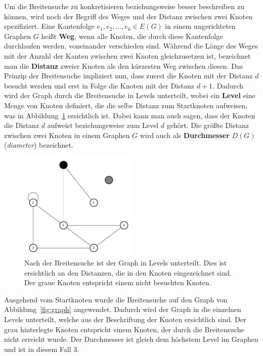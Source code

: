 \documentclass[11pt,a4paper]{article}
\begin{document}
Um die Breitensuche zu konkretisieren beziehungsweise besser beschreiben zu können, wird noch der Begriff des Weges und der Distanz zwischen zwei Knoten spezifiziert. Eine Kantenfolge \(e_{1}, e_{2}, ..., e_{k} \in E(G)\) in einem ungerichteten Graphen \(G\) heißt \textbf{Weg}, wenn alle Knoten, die durch diese Kantenfolge durchlaufen werden, voneinander verschieden sind. Während die Länge des Weges mit der Anzahl der Kanten zwischen zwei Knoten gleichzusetzen ist, bezeichnet man die \textbf{Distanz} zweier Knoten  als den kürzesten Weg zwischen diesen. Das Prinzip der Breitensuche impliziert nun, dass zuerst die Knoten mit der Distanz \(d\) besucht werden und erst in Folge die Knoten mit der Distanz \(d+1\). Dadurch wird der Graph durch die Breitensuche in Levels unterteilt, wobei ein \textbf{Level} eine Menge von Knoten definiert, die die selbe Distanz zum Startknoten aufweisen, was in Abbildung~\ref{fig:graph_level} ersichtlich ist. Dabei kann man auch sagen, dass der Knoten die Distanz \(d\) aufweist beziehungsweise zum Level \(d\) gehört. Die größte Distanz zwischen zwei Knoten in einem Graphen \(G\) wird auch als \textbf{Durchmesser} \(D(G)\) (\textit{diameter}) bezeichnet.\\
\begin{figure}[h]
 	\centering
	\includegraphics[width=0.5\textwidth]{graph_level}
 	\caption{Nach der Breitensuche ist der Graph in Levels unterteilt. Dies ist ersichtlich an den Distanzen, die in den Knoten eingezeichnet sind. Der graue Knoten entspricht einem nicht besuchten Knoten.}
	\label{fig:graph_level}
\end{figure}
Ausgehend vom Startknoten wurde die Breitensuche auf den Graph von Abbildung~\ref{fig:graph} angewendet. Dadurch wird der Graph in die einzelnen Levels unterteilt, welche aus der Beschriftung der Knoten ersichtlich sind. Der grau hinterlegte Knoten entspricht einem Knoten, der durch die Breitensuche nicht erreicht wurde. Der Durchmesser ist gleich dem höchstem Level im Graphen und ist in diesem Fall \(3\).
\end{document}
